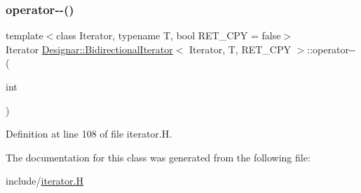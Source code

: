 \subsubsection{\texorpdfstring{operator-\/-\/()}{operator--()}\hspace{0.1cm}{\footnotesize\ttfamily [2/2]}}
{\footnotesize\ttfamily template$<$class Iterator, typename T, bool R\+E\+T\+\_\+\+C\+PY = false$>$ \\
Iterator \hyperlink{class_designar_1_1_bidirectional_iterator}{Designar\+::\+Bidirectional\+Iterator}$<$ Iterator, T, R\+E\+T\+\_\+\+C\+PY $>$\+::operator-\/-\/ (\begin{DoxyParamCaption}\item[{int}]{ }\end{DoxyParamCaption})\hspace{0.3cm}{\ttfamily [inline]}}



Definition at line 108 of file iterator.\+H.



The documentation for this class was generated from the following file\+:\begin{DoxyCompactItemize}
\item 
include/\hyperlink{iterator_8_h}{iterator.\+H}\end{DoxyCompactItemize}
